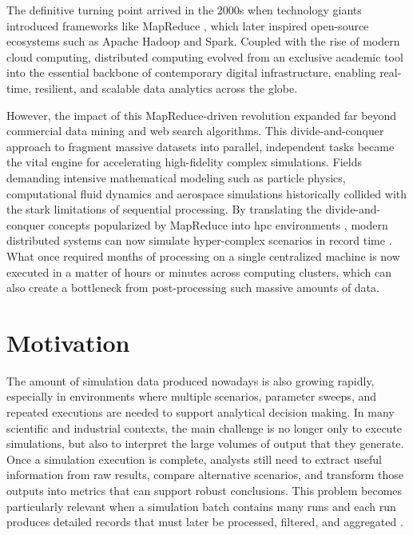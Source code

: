 The definitive turning point arrived in the 2000s when technology giants introduced frameworks like MapReduce \parencite{dean2004mapreduce}, which later inspired open-source ecosystems such as Apache Hadoop and Spark. Coupled with the rise of modern cloud computing, distributed computing evolved from an exclusive academic tool into the essential backbone of contemporary digital infrastructure, enabling real-time, resilient, and scalable data analytics across the globe.

However, the impact of this MapReduce-driven revolution expanded far beyond commercial data mining and web search algorithms. This divide-and-conquer approach to fragment massive datasets into parallel, independent tasks became the vital engine for accelerating high-fidelity complex simulations. Fields demanding intensive mathematical modeling such as particle physics, computational fluid dynamics and aerospace simulations historically collided with the stark limitations of sequential processing. By translating the divide-and-conquer concepts popularized by MapReduce into \gls{hpc} environments \parencite{ekanayake2010twister}, modern distributed systems can now simulate hyper-complex scenarios in record time \parencite{reed2015exascale}. What once required months of processing on a single centralized machine is now executed in a matter of hours or minutes across computing clusters, which can also create a bottleneck from post-processing such massive amounts of data.

\section{Motivation}
\label{sec:cap1-motivation}

The amount of simulation data produced nowadays is also growing rapidly, especially in environments where multiple scenarios, parameter sweeps, and repeated executions are needed to support analytical decision making. In many scientific and industrial contexts, the main challenge is no longer only to execute simulations, but also to interpret the large volumes of output that they generate. Once a simulation execution is complete, analysts still need to extract useful information from raw results, compare alternative scenarios, and transform those outputs into metrics that can support robust conclusions. This problem becomes particularly relevant when a simulation batch contains many runs and each run produces detailed records that must later be processed, filtered, and aggregated \parencite{li2018postprocessing,lagares2022aquila}.

